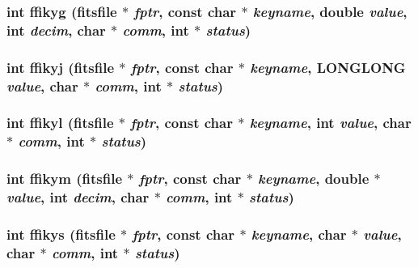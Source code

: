 \subsubsection{\setlength{\rightskip}{0pt plus 5cm}int ffikyg (\bf{fitsfile} $\ast$ {\em fptr}, const char $\ast$ {\em keyname}, double {\em value}, int {\em decim}, char $\ast$ {\em comm}, int $\ast$ {\em status})}\label{test_2shm__client_2fitsio_8h_24996516801432718d31f7426d064006}


\subsubsection{\setlength{\rightskip}{0pt plus 5cm}int ffikyj (\bf{fitsfile} $\ast$ {\em fptr}, const char $\ast$ {\em keyname}, \bf{LONGLONG} {\em value}, char $\ast$ {\em comm}, int $\ast$ {\em status})}\label{test_2shm__client_2fitsio_8h_13613553fb1fc6a12fd7cd38c8d434bb}


\subsubsection{\setlength{\rightskip}{0pt plus 5cm}int ffikyl (\bf{fitsfile} $\ast$ {\em fptr}, const char $\ast$ {\em keyname}, int {\em value}, char $\ast$ {\em comm}, int $\ast$ {\em status})}\label{test_2shm__client_2fitsio_8h_a4ca40c0298931f7db20e3bc061dad32}


\subsubsection{\setlength{\rightskip}{0pt plus 5cm}int ffikym (\bf{fitsfile} $\ast$ {\em fptr}, const char $\ast$ {\em keyname}, double $\ast$ {\em value}, int {\em decim}, char $\ast$ {\em comm}, int $\ast$ {\em status})}\label{test_2shm__client_2fitsio_8h_304bdae48864568598985614f7d2fdac}


\subsubsection{\setlength{\rightskip}{0pt plus 5cm}int ffikys (\bf{fitsfile} $\ast$ {\em fptr}, const char $\ast$ {\em keyname}, char $\ast$ {\em value}, char $\ast$ {\em comm}, int $\ast$ {\em status})}\label{test_2shm__client_2fitsio_8h_05970f0b7eb3d0035419ea3aaddb3517}


